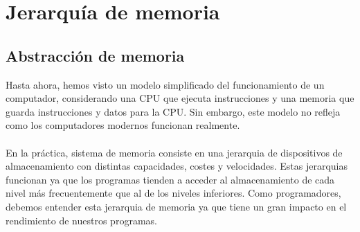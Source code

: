\chapter{Jerarquía de memoria}
\section{Abstracción de memoria}
Hasta ahora, hemos visto un modelo simplificado del funcionamiento de un computador,
considerando una CPU que ejecuta instrucciones y una memoria que guarda instrucciones 
y datos para la CPU. Sin embargo, este modelo no refleja como los computadores modernos
funcionan realmente.
\\ \\ 
En la práctica, sistema de memoria consiste en una jerarquia de dispositivos de almacenamiento
con distintas capacidades, costes y velocidades. Estas jerarquias funcionan ya que los programas
tienden a acceder al almacenamiento de cada nivel más frecuentemente que al de los niveles inferiores.
Como programadores, debemos entender esta jerarquia de memoria ya que tiene un gran impacto en el 
rendimiento de nuestros programas. 
